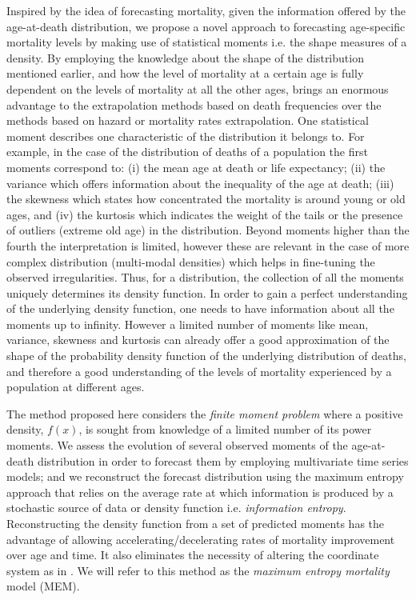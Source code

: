 \documentclass[T0_MEM]{subfiles}
\begin{document}
Inspired by the idea of forecasting mortality, given the information offered by the age-at-death distribution, we propose a novel approach to forecasting age-specific mortality levels by making use of statistical moments i.e. the shape measures of a density. By employing the knowledge about the shape of the distribution mentioned earlier, and how the level of mortality at a certain age is fully dependent on the levels of mortality at all the other ages, brings an enormous advantage to the extrapolation methods based on death frequencies over the methods based on hazard or mortality rates extrapolation. One statistical moment describes one characteristic of the distribution it belongs to. For example, in the case of the distribution of deaths of a population the first moments correspond to: (i) the mean age at death or life expectancy; (ii) the variance which offers information about the inequality of the age at death; (iii) the skewness which states how concentrated the mortality is around young or old ages, and (iv) the kurtosis which indicates the weight of the tails or the presence of outliers (extreme old age) in the distribution. Beyond moments higher than the fourth the interpretation is limited, however these are relevant in the case of more complex distribution (multi-modal densities) which helps in fine-tuning the observed irregularities. Thus, for a distribution, the collection of all the moments uniquely determines its density function. In order to gain a perfect understanding of the underlying density function, one needs to have information about all the moments up to infinity. However a limited number of moments like mean, variance, skewness and kurtosis can already offer a good approximation of the shape of the probability density function of the underlying distribution of deaths, and therefore a good understanding of the levels of mortality experienced by a population at different ages.

The method proposed here considers the \emph{finite moment problem} where a positive density,
$f(x)$, is sought from knowledge of a limited number of its power moments. We assess the
evolution of several observed moments of the age-at-death distribution in order to forecast
them by employing multivariate time series models; and we reconstruct the forecast
distribution using the maximum entropy approach \citep{mead1984} that relies on the average rate at which information is produced by a stochastic source of data or density function i.e. \emph{information entropy}. Reconstructing the density function from a set of predicted moments has the advantage of allowing accelerating/decelerating rates of mortality improvement over age and time. It also eliminates the necessity of altering the coordinate system as in \cite{oeppen2008}. We will refer to this method as the \emph{maximum entropy mortality} model (MEM).
\end{document}

